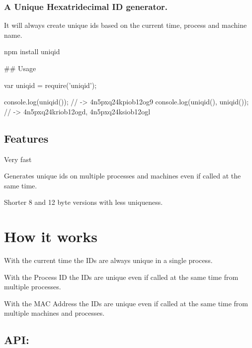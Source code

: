 

 

\subsubsection*{A Unique Hexatridecimal ID generator.}

It will always create unique id\textquotesingle{}s based on the current time, process and machine name.


\begin{DoxyCode}
npm install uniqid
\end{DoxyCode}


\#\# Usage 
\begin{DoxyCode}
var uniqid = require('uniqid');

console.log(uniqid()); // -> 4n5pxq24kpiob12og9
console.log(uniqid(), uniqid()); // -> 4n5pxq24kriob12ogd, 4n5pxq24ksiob12ogl
\end{DoxyCode}


\subsection*{Features}


\begin{DoxyItemize}
\item Very fast
\item Generates unique id\textquotesingle{}s on multiple processes and machines even if called at the same time.
\item Shorter 8 and 12 byte versions with less uniqueness.
\end{DoxyItemize}

\section*{How it works}


\begin{DoxyItemize}
\item With the current time the ID\textquotesingle{}s are always unique in a single process.
\item With the Process ID the ID\textquotesingle{}s are unique even if called at the same time from multiple processes.
\item With the M\+AC Address the ID\textquotesingle{}s are unique even if called at the same time from multiple machines and processes.
\end{DoxyItemize}

\subsection*{A\+PI\+:}

